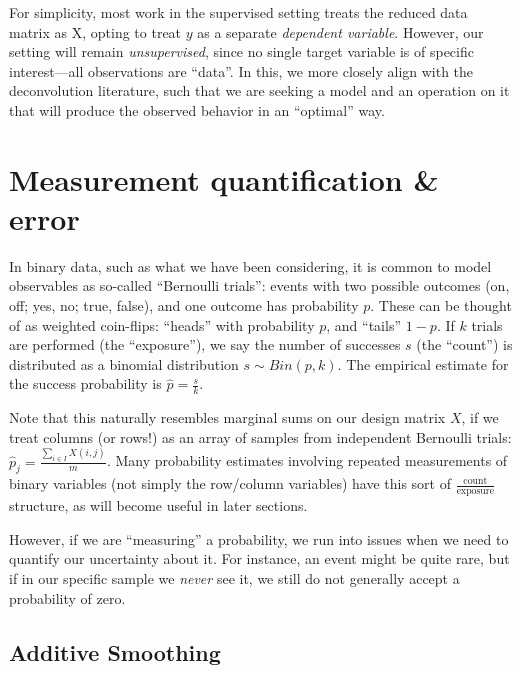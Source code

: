 \documentclass[%
	12pt,
		oneside,
		letterpaper
]{book}
\begin{document}
For simplicity, most work in the supervised setting treats the reduced data matrix as X, opting to treat \(y\) as a separate \emph{dependent variable}.
However, our setting will remain \emph{unsupervised}, since no single target variable is of specific interest---all observations are ``data''.
In this, we more closely align with the deconvolution literature, such that we are seeking a model and an operation on it that will produce the observed behavior in an ``optimal'' way.

\section{Measurement quantification \& error}\label{sec-smooth-err}

In binary data, such as what we have been considering, it is common to model observables as so-called ``Bernoulli trials'': events with two possible outcomes (on, off; yes, no; true, false), and one outcome has probability \(p\).
These can be thought of as weighted coin-flips: ``heads'' with probability \(p\), and ``tails'' \(1-p\).
If \(k\) trials are performed (the ``exposure''), we say the number of successes \(s\) (the ``count'') is distributed as a binomial distribution \(s\sim Bin(p,k)\).
The empirical estimate for the success probability is \(\hat{p}=\tfrac{s}{k}\).

Note that this naturally resembles marginal sums on our design matrix \(X\), if we treat columns (or rows!) as an array of samples from independent Bernoulli trials: \(\hat{p}_j = \frac{\sum_{i\in I} X(i,j)}{m}\).
Many probability estimates involving repeated measurements of binary variables (not simply the row/column variables) have this sort of \(\frac{\textrm{count}}{\textrm{exposure}}\) structure, as will become useful in later sections.

However, if we are ``measuring'' a probability, we run into issues when we need to quantify our uncertainty about it.
For instance, an event might be quite rare, but if in our specific sample we \emph{never} see it, we still do not generally accept a probability of zero.

\subsection{Additive Smoothing}\label{sec-counting}
\end{document}
